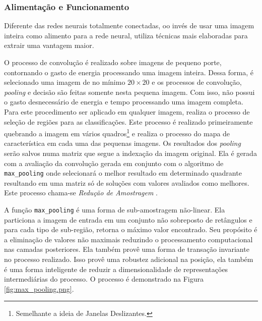 \documentclass[10pt, conference]{IEEEtran}
\begin{document}
		\subsubsection{Alimentação e Funcionamento}
			Diferente das redes neurais totalmente conectadas, oo invés de usar uma imagem inteira como alimento para a rede neural, utiliza técnicas mais elaboradas para extrair uma vantagem maior.

			O processo de convolução é realizado sobre imagens de pequeno porte, contornando o gasto de energia processando uma imagem inteira. Dessa forma, é selecionado uma imagem de no mínimo $ 20 \times 20 $ e os processos de convolução, \textit{pooling} e decisão são feitas somente nesta pequena imagem. Com isso, não possui o gasto desnecessário de energia e tempo processando uma imagem completa. Para este procedimento ser aplicado em qualquer imagem, realiza o processo de seleção de regiões para as classificações. Este processo é realizado primeiramente quebrando a imagem em vários quadros\footnote{Semelhante a ideia de Janelas Deslizantes.} e realiza o processo do mapa de característica em cada uma das pequenas imagens. Os resultados dos \textit{pooling} serão salvos numa matriz que segue a indexação da imagem original. Ela é gerada com a avaliação da convolução gerada em conjunto com o algoritmo de \texttt{max\_pooling} onde selecionará o melhor resultado em determinado quadrante resultando em uma matriz só de soluções com valores avaliados como melhores. Este processo chama-se \textit{Redução de Amostragem}  \cite{Garcia2004} \cite{Giusti2013}.

			A função \texttt{max\_pooling} é uma forma de sub-amostragem não-linear. Ela particiona a imagem de entrada em um conjunto não sobreposto de retângulos e para cada tipo de sub-região, retorna o máximo valor encontrado. Seu propósito é a eliminação de valores não maximais reduzindo o processamento computacional nas camadas posteriores. Ela também provê uma forma de transação invariante no processo realizado. Isso provê uma robustez adicional na posição, ela também é uma forma inteligente de reduzir a dimensionalidade de representações intermediárias do processo. O processo é demonstrado na Figura \ref{fig:max_pooling.png}.
\end{document}
